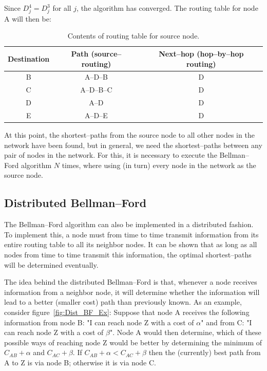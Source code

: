 \documentclass[a4paper]{article}
\begin{document}
\noindent{}Since $D^{4}_{j} = D^{3}_{j}$ for all $j$, the
algorithm has converged. The routing table for node A will then
be:
\begin{table}[!ht]
\centering
\begin{tabular}{|c|c|c|}\hline
%
Destination & Path (source--routing) & Next--hop (hop--by--hop
routing) \\ \hline
%
B & A--D--B & D \\ \hline
%
C & A--D--B--C & D \\ \hline
%
D & A--D & D \\ \hline
%
E & A--D--E & D \\ \hline
\end{tabular}
\caption{Contents of routing table for source node.}
\end{table}

At this point, the shortest--paths from the source node to all
other nodes in the network have been found, but in general, we
need the shortest--paths between any pair of nodes in the network.
For this, it is necessary to execute the Bellman--Ford algorithm
$N$ times, where using (in turn) every node in the network as the
source node.

\subsection{Distributed Bellman--Ford}
\noindent{}The Bellman--Ford algorithm can also be implemented in
a distributed fashion. To implement this, a node must from time to
time transmit information from its entire routing table to all its
neighbor nodes. It can be shown that as long as all nodes from
time to time transmit this information, the optimal
shortest--paths will be determined eventually.

The idea behind the distributed Bellman--Ford is that, whenever a
node receives information from a neighbor node, it will determine
whether the information will lead to a better (smaller cost) path
than previously known. As an example, consider
figure~\ref{fig:Dist_BF_Ex}: Suppose that node A receives the
following information from node B: "I can reach node Z with a cost
of $\alpha$" and from C: "I can reach node Z with a cost of
$\beta$". Node A would then determine, which of these possible
ways of reaching node Z would be better by determining the minimum
of $C_{AB} + \alpha$ and $C_{AC} + \beta$. If $C_{AB} + \alpha <
C_{AC} + \beta$ then the (currently) best path from A to Z is via
node B; otherwise it is via node C.
\end{document}
